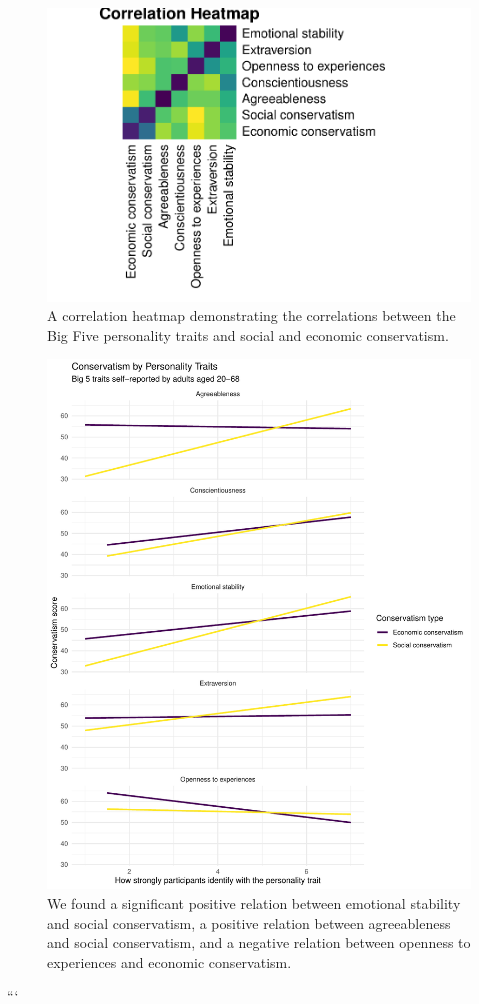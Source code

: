 \documentclass[man]{apa6}
\begin{document}
\begin{figure}
\centering
\includegraphics{manuscript_files/figure-latex/figure1-1.pdf}
\caption{\label{fig:figure1}A correlation heatmap demonstrating the
correlations between the Big Five personality traits and social and
economic conservatism.}
\end{figure}

\begin{figure}
\centering
\includegraphics{manuscript_files/figure-latex/figure2-1.pdf}
\caption{\label{fig:figure2}We found a significant positive relation between
emotional stability and social conservatism, a positive relation between
agreeableness and social conservatism, and a negative relation between
openness to experiences and economic conservatism.}
\end{figure}

```

\endgroup
\end{document}

